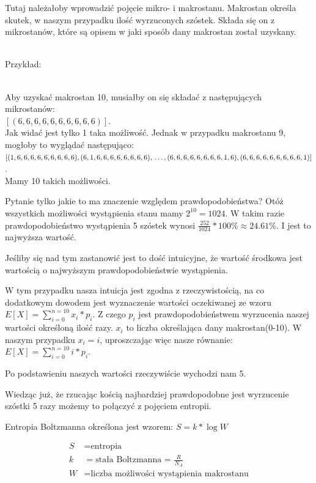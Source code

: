 \documentclass[11pt, a4paper, fleqn]{article}
\begin{document}
    Tutaj należałoby wprowadzić pojęcie mikro- i makrostanu. Makrostan określa skutek, w naszym przypadku ilość wyrzuconych szóstek.
    Składa się on z mikrostanów, które są opisem w jaki sposób dany makrostan został uzyskany. \\ \\
    \noindent \begin{large}Przykład:\end{large}  \\

    Aby uzyskać makrostan 10, musiałby on się składać z następujących mikrostanów: \\
    $[(6,6,6,6,6,6,6,6,6,6)]$.\\
    Jak widać jest tylko 1 taka możliwość. Jednak w przypadku makrostanu 9, mogłoby to wyglądać następująco:\\
    $[(1,6,6,6,6,6,6,6,6,6), (6,1,6,6,6,6,6,6,6,6),\\ \dots,\\(6,6,6,6,6,6,6,6,1,6), (6,6,6,6,6,6,6,6,6,1)]$. \\
    Mamy 10 takich możliwości.

    Pytanie tylko jakie to ma znaczenie względem prawdopodobieństwa?
    Otóż wszystkich możliwości wystąpienia stanu mamy $2^{10}=1024$. W takim razie prawdopodobieństwo
    wystąpienia 5 szóstek wynosi $\frac{252}{1024}*100 \% \approx 24.61\%$. I jest to najwyższa wartość.

    Jeśliby się nad tym zastanowić jest to dość intuicyjne, że wartość środkowa jest wartością o najwyższym prawdopodobieństwie
    wystąpienia.

    W tym przypadku nasza intuicja jest zgodna z rzeczywistością, na co dodatkowym dowodem jest wyznaczenie
    wartości oczekiwanej ze wzoru $E[X] = \sum_{i=0}^{n=10} x_i * p_i$. Z czego $p_i$ jest prawdopodobieństwem wyrzucenia
    naszej wartości określoną ilość razy. $x_i$ to liczba określająca dany makrostan(0-10). W naszym przypadku $x_i = i$, 
    uproszczając więc nasze równanie: $E[X] = \sum_{i=0}^{n=10} i*p_i$. 

    Po podstawieniu naszych wartości rzeczywiście wychodzi nam 5.

    Wiedząc już, że rzucając kością najbardziej prawdopodobne jest wyrzucenie szóstki 5 razy możemy to połączyć 
    z pojęciem entropii.

    Entropia Boltzmanna określona jest wzorem: $S = k*\log{W}$

    \begin{align*}
        S &= \text{entropia}\\
        k &= \text{stała Boltzmanna = $\frac{R}{N_A}$}\\
        W &= \text{liczba możliwości wystąpienia makrostanu}
    \end{align*}
\end{document}
